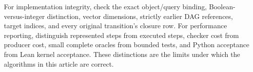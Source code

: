 \documentclass[11pt,a4paper]{article}
\theoremstyle{definition}
\theoremstyle{remark}
\begin{document}
For implementation integrity, check the exact object/query binding, Boolean-versus-integer distinction, vector dimensions, strictly earlier DAG references, target indices, and every original transition's closure row. For performance reporting, distinguish represented steps from executed steps, checker cost from producer cost, small complete oracles from bounded tests, and Python acceptance from Lean kernel acceptance. These distinctions are the limits under which the algorithms in this article are correct.

\clearpage

\end{document}
